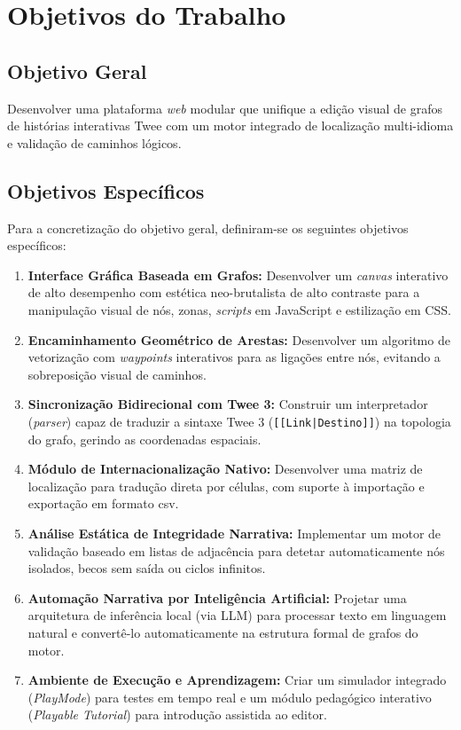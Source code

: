 \section{Objetivos do Trabalho}
\subsection{Objetivo Geral}
Desenvolver uma plataforma \textit{web} modular que unifique a edição visual de grafos de histórias interativas Twee com um motor integrado de localização multi-idioma e validação de caminhos lógicos.

\subsection{Objetivos Específicos}
Para a concretização do objetivo geral, definiram-se os seguintes objetivos específicos:
\begin{enumerate}
    \item \textbf{Interface Gráfica Baseada em Grafos:} Desenvolver um \textit{canvas} interativo de alto desempenho com estética neo-brutalista de alto contraste para a manipulação visual de nós, zonas, \textit{scripts} em JavaScript e estilização em CSS.
    \item \textbf{Encaminhamento Geométrico de Arestas:} Desenvolver um algoritmo de vetorização com \textit{waypoints} interativos para as ligações entre nós, evitando a sobreposição visual de caminhos.
    \item \textbf{Sincronização Bidirecional com Twee 3:} Construir um interpretador (\textit{parser}) capaz de traduzir a sintaxe Twee 3 (\lstinline{[[Link|Destino]]}) na topologia do grafo, gerindo as coordenadas espaciais.
    \item \textbf{Módulo de Internacionalização Nativo:} Desenvolver uma matriz de localização para tradução direta por células, com suporte à importação e exportação em formato \gls{csv}.
    \item \textbf{Análise Estática de Integridade Narrativa:} Implementar um motor de validação baseado em listas de adjacência para detetar automaticamente nós isolados, becos sem saída ou ciclos infinitos.
    \item \textbf{Automação Narrativa por Inteligência Artificial:} Projetar uma arquitetura de inferência local (via LLM) para processar texto em linguagem natural e convertê-lo automaticamente na estrutura formal de grafos do motor.
    \item \textbf{Ambiente de Execução e Aprendizagem:} Criar um simulador integrado (\textit{PlayMode}) para testes em tempo real e um módulo pedagógico interativo (\textit{Playable Tutorial}) para introdução assistida ao editor.
\end{enumerate}

